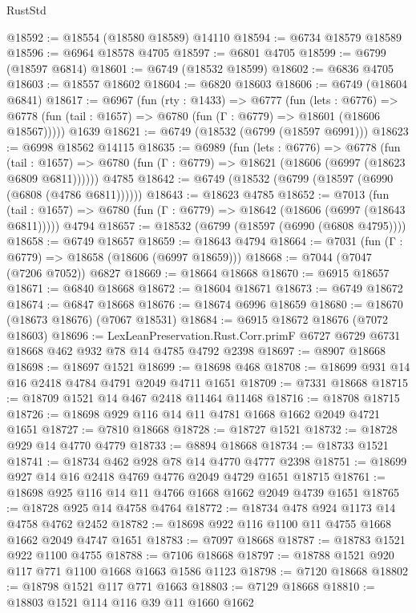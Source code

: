 \begin{lexlean}{RustStd}
\begin{coremodule}
@18592 := @18554 (@18580 @18589) @14110
@18594 := @6734 @18579 @18589
@18596 := @6964 @18578 @4705
@18597 := @6801 @4705
@18599 := @6799 (@18597 @6814)
@18601 := @6749 (@18532 @18599)
@18602 := @6836 @4705
@18603 := @18557 @18602
@18604 := @6820 @18603
@18606 := @6749 (@18604 @6841)
@18617 := @6967
    (fun (rty : @1433) =>
    @6777
      (fun (lets : @6776) =>
      @6778 (fun (tail : @1657) => @6780 (fun (Γ : @6779) => @18601 (@18606 @18567)))))
    @1639
@18621 := @6749 (@18532 (@6799 (@18597 @6991)))
@18623 := @6998 @18562 @14115
@18635 := @6989
    (fun (lets : @6776) =>
    @6778
      (fun (tail : @1657) =>
      @6780 (fun (Γ : @6779) => @18621 (@18606 (@6997 (@18623 @6809 @6811))))))
    @4785
@18642 := @6749 (@18532 (@6799 (@18597 (@6990 (@6808 (@4786 @6811))))))
@18643 := @18623 @4785
@18652 := @7013
    (fun (tail : @1657) => @6780 (fun (Γ : @6779) => @18642 (@18606 (@6997 (@18643 @6811)))))
    @4794
@18657 := @18532 (@6799 (@18597 (@6990 (@6808 @4795))))
@18658 := @6749 @18657
@18659 := @18643 @4794
@18664 := @7031 (fun (Γ : @6779) => @18658 (@18606 (@6997 @18659)))
@18668 := @7044 (@7047 (@7206 @7052)) @6827
@18669 := @18664 @18668
@18670 := @6915 @18657
@18671 := @6840 @18668
@18672 := @18604 @18671
@18673 := @6749 @18672
@18674 := @6847 @18668
@18676 := @18674 @6996 @18659
@18680 := @18670 (@18673 @18676) (@7067 @18531)
@18684 := @6915 @18672 @18676 (@7072 @18603)
@18696 := LexLeanPreservation.Rust.Corr.primF
    @6727
    @6729
    @6731
    @18668
    @462
    @932
    @78
    @14
    @4785
    @4792
    @2398
@18697 := @8907 @18668
@18698 := @18697 @1521
@18699 := @18698 @468
@18708 := @18699 @931 @14 @16 @2418 @4784 @4791 @2049 @4711 @1651
@18709 := @7331 @18668
@18715 := @18709 @1521 @14 @467 @2418 @11464 @11468
@18716 := @18708 @18715
@18726 := @18698 @929 @116 @14 @11 @4781 @1668 @1662 @2049 @4721 @1651
@18727 := @7810 @18668
@18728 := @18727 @1521
@18732 := @18728 @929 @14 @4770 @4779
@18733 := @8894 @18668
@18734 := @18733 @1521
@18741 := @18734 @462 @928 @78 @14 @4770 @4777 @2398
@18751 := @18699 @927 @14 @16 @2418 @4769 @4776 @2049 @4729 @1651 @18715
@18761 := @18698 @925 @116 @14 @11 @4766 @1668 @1662 @2049 @4739 @1651
@18765 := @18728 @925 @14 @4758 @4764
@18772 := @18734 @478 @924 @1173 @14 @4758 @4762 @2452
@18782 := @18698 @922 @116 @1100 @11 @4755 @1668 @1662 @2049 @4747 @1651
@18783 := @7097 @18668
@18787 := @18783 @1521 @922 @1100 @4755
@18788 := @7106 @18668
@18797 := @18788 @1521 @920 @117 @771 @1100 @1668 @1663 @1586 @1123
@18798 := @7120 @18668
@18802 := @18798 @1521 @117 @771 @1663
@18803 := @7129 @18668
@18810 := @18803 @1521 @114 @116 @39 @11 @1660 @1662

\end{coremodule}
\end{lexlean}

